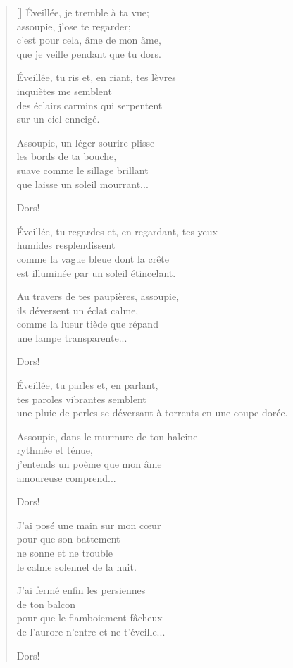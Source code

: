 \documentclass[a4paper,12pt]{book}
\begin{document}
\begin{verse}[\versewidth]
  Éveillée, je tremble à ta vue; \\
  assoupie, j'ose te regarder; \\
  c'est pour cela, âme de mon âme, \\
  que je veille pendant que tu dors.

  Éveillée, tu ris et, en riant, tes lèvres \\
  inquiètes me semblent \\
  des éclairs carmins qui serpentent \\
  sur un ciel enneigé.

  Assoupie, un léger sourire plisse \\
  les bords de ta bouche, \\
  suave comme le sillage brillant \\
  que laisse un soleil mourrant...

  Dors!

  Éveillée, tu regardes et, en regardant, tes yeux \\
  humides resplendissent \\
  comme la vague bleue dont la crête \\
  est illuminée par un soleil étincelant.

  Au travers de tes paupières, assoupie, \\
  ils déversent un éclat calme, \\
  comme la lueur tiède que répand \\
  une lampe transparente...

  Dors!

  Éveillée, tu parles et, en parlant, \\
  tes paroles vibrantes semblent \\
  une pluie de perles se déversant à torrents
  en une coupe dorée.

  Assoupie, dans le murmure de ton haleine \\
  rythmée et ténue, \\
  j'entends un poème que mon âme \\
  amoureuse comprend...

  Dors!

  J'ai posé une main sur mon cœur \\
  pour que son battement \\
  ne sonne et ne trouble \\
  le calme solennel de la nuit.

  J'ai fermé enfin les persiennes \\
  de ton balcon \\
  pour que le flamboiement fâcheux \\
  de l'aurore n'entre et ne t'éveille...

  Dors!
\end{verse}
\end{document}
